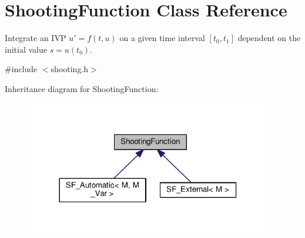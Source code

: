 \hypertarget{classShootingFunction}{}\section{Shooting\+Function Class Reference}
\label{classShootingFunction}


Integrate an I\+VP $u' = f(t, u)$ on a given time interval $[t_0, t_1]$ dependent on the initial value $s = u(t_0)$.  




{\ttfamily \#include $<$shooting.\+h$>$}



Inheritance diagram for Shooting\+Function\+:\nopagebreak
\begin{figure}[H]
\begin{center}
\leavevmode
\includegraphics[width=306pt]{classShootingFunction__inherit__graph}
\end{center}
\end{figure}
